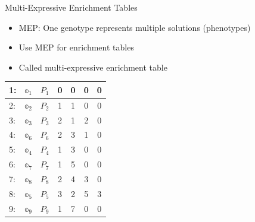 \documentclass[aspectratio=1610,table]{beamer}
\begin{document}
\begin{frame}{Multi-Expressive Enrichment Tables}
\begin{itemize}[<+->]
  \item MEP: One genotype represents multiple solutions (phenotypes)
  \item Use MEP for enrichment tables
  \item Called multi-expressive enrichment table
\end{itemize}
  \begin{center}
\begin{tabular}{lc|c|c|c|c|c}
  \rowcolor{green!50!black}
  1: & $\mathbb{o}_1$ & $P_1$ & 0 & 0 & 0 & 0\\ \hline
  \rowcolor{orange}
  2: & $\mathbb{o}_2$ & $P_2$ & 1 & 1 & 0 & 0\\ \hline
  \rowcolor{orange}
  3: & $\mathbb{o}_3$ & $P_3$ & 2 & 1 & 2 & 0\\ \hline
  \rowcolor{orange}
  4: & $\mathbb{o}_6$ & $P_6$ & 2 & 3 & 1 & 0\\ \hline
  \rowcolor{orange}
  5: & $\mathbb{o}_4$ & $P_4$ & 1 & 3 & 0 & 0\\ \hline
  \rowcolor{darkred!70}
  6: & $\mathbb{o}_7$ & $P_7$ & 1 & 5 & 0 & 0\\ \hline
  \rowcolor{orange}
  7: & $\mathbb{o}_8$ & $P_8$ & 2 & 4 & 3 & 0\\ \hline
  \rowcolor{darkred!70}
  8: & $\mathbb{o}_5$ & $P_5$ & 3 & 2 & 5 & 3\\ \hline
  \rowcolor{darkred!70}
  9: & $\mathbb{o}_9$ & $P_9$ & 1 & 7 & 0 & 0
\end{tabular} 
\end{center}
\end{frame}
\end{document}
